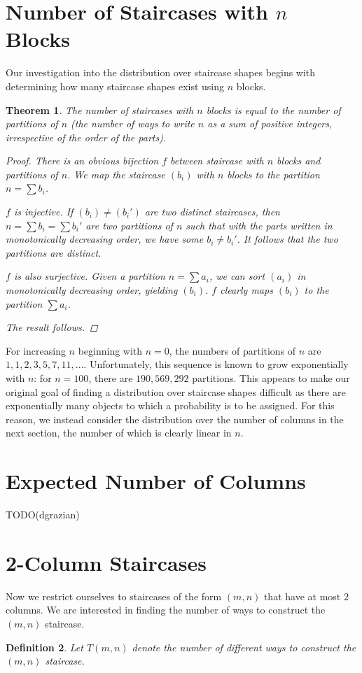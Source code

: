 \documentclass[12pt]{amsart}
\newtheorem{theorem}{Theorem}[section]
\newtheorem{definition}[theorem]{Definition}
\newcommand{\newsection}[2]{
\section{#1 \label{#2}}
}
\begin{document}
\newsection{Number of Staircases with $n$ Blocks}{sec:numstaircases}
Our investigation into the distribution over staircase shapes begins with determining how many staircase shapes exist using $n$ blocks.

\begin{theorem}
The number of staircases with $n$ blocks is equal to the number of partitions of $n$ (the number of ways to write $n$ as a sum of positive integers, irrespective of the order of the parts).
\begin{proof}
There is an obvious bijection $f$ between staircase with $n$ blocks and partitions of $n$. We map the staircase $(b_i)$ with $n$ blocks to the partition $n=\sum b_i$.

$f$ is injective. If $(b_i)\neq (b_i')$ are two distinct staircases, then $n = \sum b_i = \sum b_i'$ are two partitions of $n$ such that with the parts written in monotonically decreasing order, we have some $b_i\neq b_i'$. It follows that the two partitions are distinct.

$f$ is also surjective. Given a partition $n = \sum a_i$, we can sort $(a_i)$ in monotonically decreasing order, yielding $(b_i)$. $f$ clearly maps $(b_i)$ to the partition $\sum a_i$.

The result follows.
\end{proof}
\end{theorem}

For increasing $n$ beginning with $n = 0$, the numbers of partitions of $n$ are $1, 1, 2, 3, 5, 7, 11, \ldots$. Unfortunately, this sequence is known to grow exponentially with $n$: for $n = 100$, there are $190,569,292$ partitions. This appears to make our original goal of finding a distribution over staircase shapes difficult as there are exponentially many objects to which a probability is to be assigned. For this reason, we instead consider the distribution over the number of columns in the next section, the number of which is clearly linear in $n$.

\newsection{Expected Number of Columns}{sec:expectedcolumns}
TODO(dgrazian)

\newsection{2-Column Staircases}{sec:twocolumn}
Now we restrict ourselves to staircases of the form $(m,n)$ that have at most $2$ columns. We are interested in finding the number of ways to construct the $(m,n)$ staircase.

\begin{definition}
Let $T(m,n)$ denote the number of different ways to construct the $(m,n)$ staircase.
\end{definition}
\end{document}
